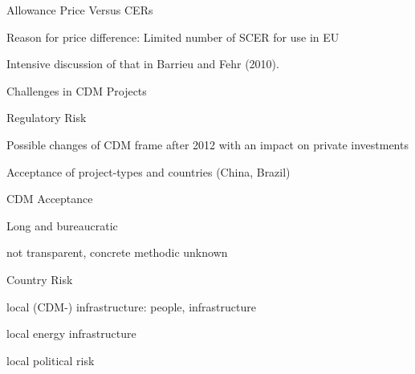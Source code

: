 {Allowance Price Versus CERs}


	Reason for price difference: Limited number of SCER for use in EU

	Intensive discussion of that in Barrieu and Fehr (2010).


{Challenges in CDM Projects}


	Regulatory  Risk


	Possible changes of CDM frame after 2012 with an impact on private investments

	Acceptance of project-types and countries (China, Brazil)


	CDM Acceptance


	Long and bureaucratic

	not transparent, concrete methodic unknown


	Country Risk


	local (CDM-) infrastructure: people, infrastructure

	local energy infrastructure

	local political risk


